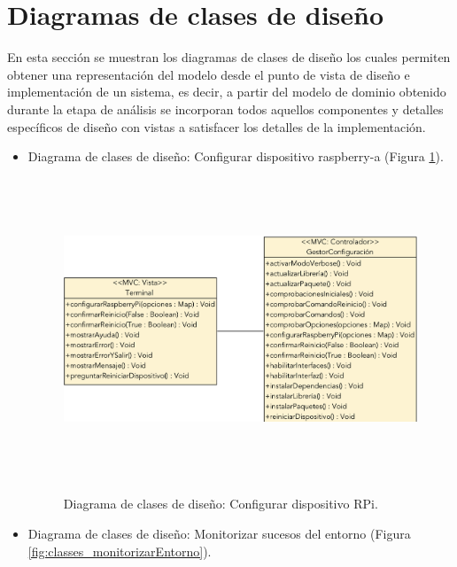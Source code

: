 \documentclass[12pt,a4paper, twoside]{report}
\begin{document}
	\newpage
	
	\section{Diagramas de clases de diseño} \label{classes}
		
	En esta sección se muestran los diagramas de clases de diseño los cuales permiten obtener una representación del modelo desde el punto de vista de diseño e implementación de un sistema, es decir, a partir del modelo de dominio obtenido durante la etapa de análisis se incorporan todos aquellos componentes y detalles específicos de diseño con vistas a satisfacer los detalles de la implementación. \\
	
	\begin{itemize}
		
		\item Diagrama de clases de diseño: Configurar dispositivo \gls{raspberry-a} (Figura \ref{fig:classes_configurarRPi1}).
		
		\begin{figure}[!ht]   
			\caption{Diagrama de clases de diseño: Configurar dispositivo RPi.} 
			\begin{center} 
	 			\includegraphics[width=17cm,height=9cm]{Images/design/classes/classes_configurarRPi} \\
				\label{fig:classes_configurarRPi1} 
			\end{center}  
		\end{figure} 
		
		\newpage
		 
		\item Diagrama de clases de diseño: Monitorizar sucesos del entorno (Figura \ref{fig:classes_monitorizarEntorno}).
		

\end{itemize}
\end{document}
